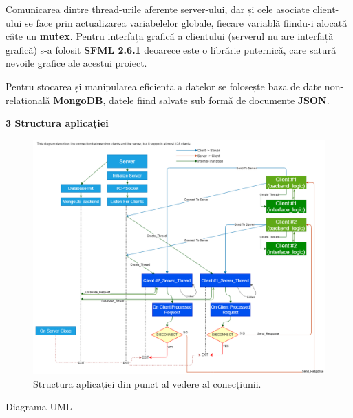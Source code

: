 \documentclass[runningheads]{llncs}
\begin{document}
Comunicarea dintre thread-urile aferente server-ului, dar și 
cele asociate client-ului se face prin actualizarea variabelelor globale, fiecare variablă fiindu-i alocată câte un {\bf mutex}.
Pentru interfața grafică a clientului (serverul nu are interfață grafică) s-a folosit {\bf SFML 2.6.1} deoarece este o librărie puternică, care satură nevoile grafice ale acestui proiect.

Pentru stocarea și manipularea eficientă a datelor se folosește baza de date non-relațională {\bf MongoDB}, datele fiind salvate sub formă de documente {\bf JSON}. 
\\

\newpage

{\Large \bf 3 Structura aplicației} 
\\

\begin{figure}[htbp!]
    \hspace{-94px} 
    \includegraphics[scale=0.65]{tcp.png}
    \caption{Structura aplicației din punct al vedere al conecțiunii.}
    \label{fig:yourlabel}
\end{figure}



\newpage
{\Large Diagrama UML}
\end{document}

